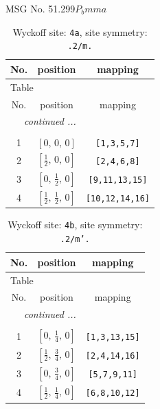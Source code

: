 \documentclass[fleqn,8pt]{jsarticle}
\begin{document}
\setcounter{MaxMatrixCols}{32}

\renewcommand{\tablename}{Table~}
\renewcommand{\figurename}{Figure~}
\begin{center}
\LARGE
MSG No. 51.299\quad$P_{b}mma$
\end{center}
\renewcommand{\arraystretch}{1.2}
\begin{longtable}{ccc}
\caption{Wyckoff site: {\tt 4a}, site symmetry: {\tt .2/m.}}
 \\
 \hline \hline
No. & position & mapping \\ \hline \endfirsthead

\multicolumn{2}{l}{\tablename\ \thetable{}} \\
 \hline \hline
No. & position & mapping \\ \hline \endhead

 \hline \hline
\multicolumn{2}{r}{\footnotesize\it continued ...} \\ \endfoot

 \hline \hline
\multicolumn{2}{r}{} \\ \endlastfoot

1 & $\left[ 0,\, 0,\, 0 \right]$ & {\tt [1,3,5,7]} \\ \hline
2 & $\left[ \frac{1}{2},\, 0,\, 0 \right]$ & {\tt [2,4,6,8]} \\ \hline
3 & $\left[ 0,\, \frac{1}{2},\, 0 \right]$ & {\tt [9,11,13,15]} \\ \hline
4 & $\left[ \frac{1}{2},\, \frac{1}{2},\, 0 \right]$ & {\tt [10,12,14,16]} \\
\end{longtable}
\renewcommand{\arraystretch}{1.2}
\begin{longtable}{ccc}
\caption{Wyckoff site: {\tt 4b}, site symmetry: {\tt .2/m'.}}
 \\
 \hline \hline
No. & position & mapping \\ \hline \endfirsthead

\multicolumn{2}{l}{\tablename\ \thetable{}} \\
 \hline \hline
No. & position & mapping \\ \hline \endhead

 \hline \hline
\multicolumn{2}{r}{\footnotesize\it continued ...} \\ \endfoot

 \hline \hline
\multicolumn{2}{r}{} \\ \endlastfoot

1 & $\left[ 0,\, \frac{1}{4},\, 0 \right]$ & {\tt [1,3,13,15]} \\ \hline
2 & $\left[ \frac{1}{2},\, \frac{3}{4},\, 0 \right]$ & {\tt [2,4,14,16]} \\ \hline
3 & $\left[ 0,\, \frac{3}{4},\, 0 \right]$ & {\tt [5,7,9,11]} \\ \hline
4 & $\left[ \frac{1}{2},\, \frac{1}{4},\, 0 \right]$ & {\tt [6,8,10,12]} \\
\end{longtable}
\end{document}
